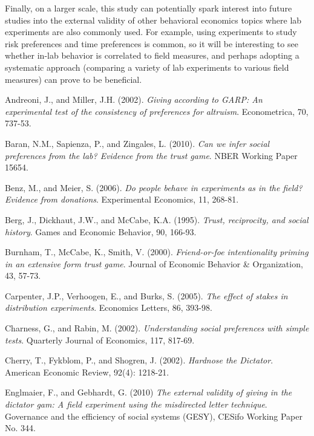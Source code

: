 \documentclass{article}
\begin{document}
Finally, on a larger scale, this study can potentially spark interest into future studies into the external validity of other behavioral economics topics where lab experiments are also commonly used. For example, using experiments to study risk preferences and time preferences is common, so it will be interesting to see whether in-lab behavior is correlated to field measures, and perhaps adopting a systematic approach (comparing a variety of lab experiments to various field measures) can prove to be beneficial.
 \newpage
\begin{thebibliography}{9}

Andreoni, J., and Miller, J.H. (2002).
\textit{Giving according to GARP: An experimental test of the consistency of preferences for altruism}.
Econometrica, 70, 737-53.

Baran, N.M., Sapienza, P., and Zingales, L. (2010).
\textit{Can we infer social preferences from the lab? Evidence from the trust game}.
NBER Working Paper 15654.

Benz, M., and Meier, S. (2006).
\textit{Do people behave in experiments as in the field? Evidence from donations}.
Experimental Economics, 11, 268-81.

Berg, J., Dickhaut, J.W., and McCabe, K.A. (1995).
\textit{Trust, reciprocity, and social history}.
Games and Economic Behavior, 90, 166-93.

Burnham, T., McCabe, K., Smith, V. (2000).
\textit{Friend-or-foe intentionality priming in an extensive form trust game}.
Journal of Economic Behavior \& Organization, 43, 57-73.

Carpenter, J.P., Verhoogen, E., and Burks, S. (2005).
\textit{The effect of stakes in distribution experiments}.
Economics Letters, 86, 393-98.

Charness, G., and Rabin, M. (2002).
\textit{Understanding social preferences with simple tests}.
Quarterly Journal of Economics, 117, 817-69.

Cherry, T., Fykblom, P., and Shogren, J. (2002).
\textit{Hardnose the Dictator}.
American Economic Review, 92(4): 1218-21.

Englmaier, F., and Gebhardt, G. (2010)
\textit{The external validity of giving in the dictator gam: A field experiment using the misdirected letter technique}.
Governance and the efficiency of social systems (GESY), CESifo Working Paper No. 344.


\end{thebibliography}
\end{document}
